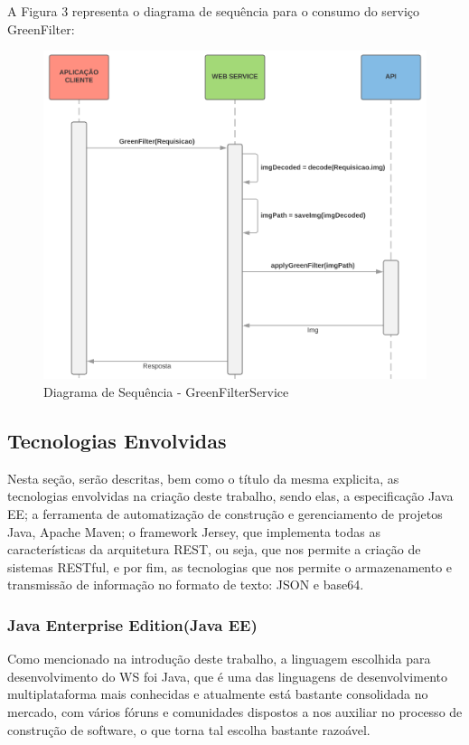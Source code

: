 \documentclass[12pt]{article}
\begin{document}
A Figura 3 representa o diagrama de sequência para o consumo do serviço GreenFilter:

\begin{figure}[ht]
	\centering
	\includegraphics[width=.7\textwidth]{ds-green-filter2.png}
	\caption{Diagrama de Sequência - GreenFilterService}
	\label{fig:Figura3}
\end{figure}

\subsection{Tecnologias Envolvidas}

Nesta seção, serão descritas, bem como o título da mesma explicita, as tecnologias envolvidas na criação deste trabalho, sendo elas, a especificação Java EE; a ferramenta de automatização de construção e gerenciamento de projetos Java, Apache Maven; o framework Jersey, que implementa todas as características da arquitetura REST, ou seja, que nos permite a criação de sistemas RESTful, e por fim, as tecnologias que nos permite o armazenamento e transmissão de informação no formato de texto: JSON e base64.

\subsubsection{Java Enterprise Edition(Java EE)}

Como mencionado na introdução deste trabalho, a linguagem escolhida para desenvolvimento do WS foi Java, que é uma das linguagens de desenvolvimento multiplataforma mais conhecidas e atualmente está bastante consolidada no mercado, com vários fóruns e comunidades dispostos a nos auxiliar no processo de construção de software, o que torna tal escolha bastante razoável. 
\end{document}
